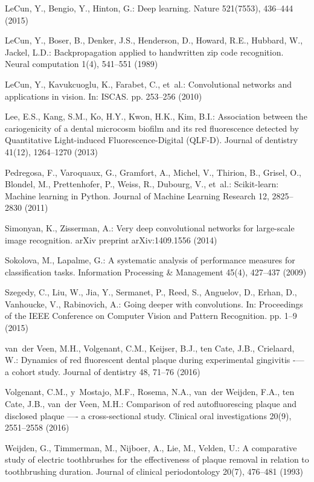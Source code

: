 \documentclass[runningheads,a4paper]{llncs}
\begin{document}
\begin{thebibliography}{10}
LeCun, Y., Bengio, Y., Hinton, G.: Deep learning. Nature  521(7553),  436--444
  (2015)

LeCun, Y., Boser, B., Denker, J.S., Henderson, D., Howard, R.E., Hubbard, W.,
  Jackel, L.D.: Backpropagation applied to handwritten zip code recognition.
  Neural computation  1(4),  541--551 (1989)

LeCun, Y., Kavukcuoglu, K., Farabet, C., et~al.: Convolutional networks and
  applications in vision. In: ISCAS. pp. 253--256 (2010)

Lee, E.S., Kang, S.M., Ko, H.Y., Kwon, H.K., Kim, B.I.: Association between the
  cariogenicity of a dental microcosm biofilm and its red fluorescence detected
  by {Q}uantitative {L}ight-induced {F}luorescence-{D}igital ({QLF-D}). Journal
  of dentistry  41(12),  1264--1270 (2013)

Pedregosa, F., Varoquaux, G., Gramfort, A., Michel, V., Thirion, B., Grisel,
  O., Blondel, M., Prettenhofer, P., Weiss, R., Dubourg, V., et~al.:
  Scikit-learn: Machine learning in {P}ython. Journal of Machine Learning
  Research  12,  2825--2830 (2011)

Simonyan, K., Zisserman, A.: Very deep convolutional networks for large-scale
  image recognition. arXiv preprint arXiv:1409.1556  (2014)

Sokolova, M., Lapalme, G.: A systematic analysis of performance measures for
  classification tasks. Information Processing \& Management  45(4),  427--437
  (2009)

Szegedy, C., Liu, W., Jia, Y., Sermanet, P., Reed, S., Anguelov, D., Erhan, D.,
  Vanhoucke, V., Rabinovich, A.: Going deeper with convolutions. In:
  Proceedings of the IEEE Conference on Computer Vision and Pattern
  Recognition. pp. 1--9 (2015)

van~der Veen, M.H., Volgenant, C.M., Keijser, B.J., ten Cate, J.B., Crielaard,
  W.: Dynamics of red fluorescent dental plaque during experimental gingivitis
  -— a cohort study. Journal of dentistry  48,  71--76 (2016)

Volgenant, C.M., y~Mostajo, M.F., Rosema, N.A., van~der Weijden, F.A., ten
  Cate, J.B., van~der Veen, M.H.: Comparison of red autofluorescing plaque and
  disclosed plaque —- a cross-sectional study. Clinical oral investigations
  20(9),  2551--2558 (2016)

Weijden, G., Timmerman, M., Nijboer, A., Lie, M., Velden, U.: A comparative
  study of electric toothbrushes for the effectiveness of plaque removal in
  relation to toothbrushing duration. Journal of clinical periodontology
  20(7),  476--481 (1993)
\end{thebibliography}
\end{document}
